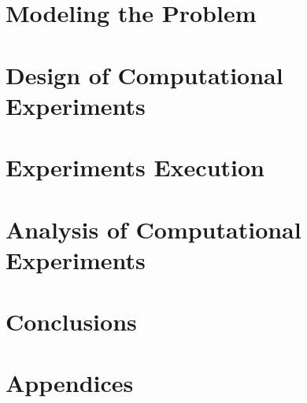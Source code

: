 \documentclass[letterpaper,12pt]{report}
\begin{document}
	\chapter{Modeling the Problem}
	\label{cha:modelingProblem}
	
	
	\chapter{Design of Computational Experiments}
	\label{cha:experimentDesign}
	

	\chapter{Experiments Execution}
	\label{cha:expExecution}
	

	\chapter{Analysis of Computational Experiments}
	\label{cha:experimentAnalysis}
		


	\chapter{Conclusions}
	\label{cha:conclusions}
	
	
	\chapter{Appendices}
	\label{cha:appendices}
	
		
%   
%	
	
	
	
\end{document}

